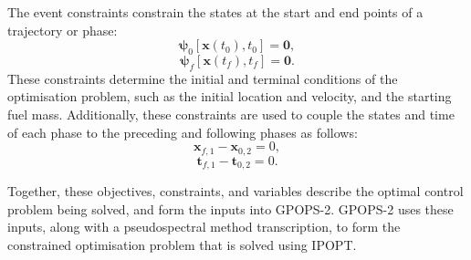 \noindent The event constraints constrain the states at the start and end points of a trajectory or phase:
\begin{equation}
\mathbf{\psi}_0[\textbf{x}(t_{0}), t_{0}] = \textbf{0},
\end{equation}
\begin{equation} \label{eq:2}
\mathbf{\psi}_f[\textbf{x}(t_{f}), t_{f}] = \textbf{0}.
\end{equation}
These constraints determine the initial and terminal conditions of the optimisation problem, such as the initial location and velocity, and the starting fuel mass. Additionally, these constraints are used to couple the states and time of each phase to the preceding and following phases as follows:
\begin{equation}
\textbf{x}_{f,1} - \textbf{x}_{0,2} = 0,
\end{equation}
\begin{equation}
\textbf{t}_{f,1} - \textbf{t}_{0,2} = 0.
\end{equation}






Together, these objectives, constraints, and variables describe the optimal control problem being solved, and form the inputs into GPOPS-2. GPOPS-2 uses these inputs, along with a pseudospectral method transcription, to form the constrained optimisation problem that is solved using IPOPT.









